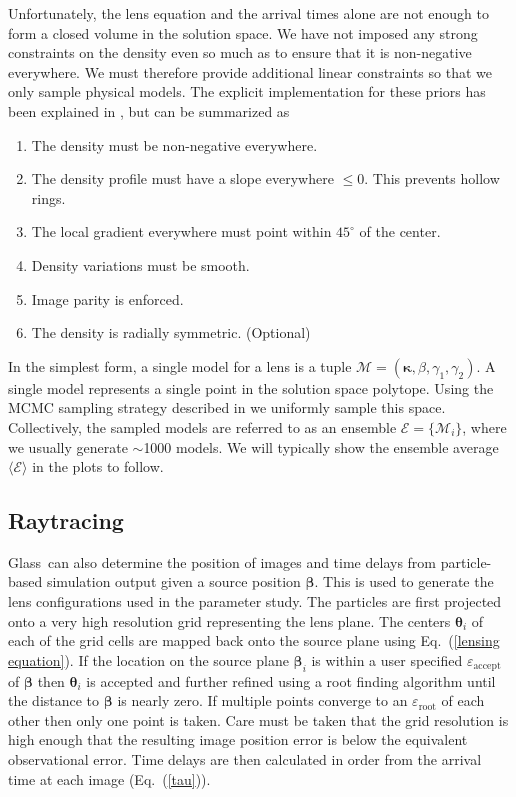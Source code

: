 \documentclass[galley]{mn2e}
\newcommand{\Glass}{{\sc Glass}}
\newcommand{\M}{\ensuremath{\mathscr{M}}}
\newcommand{\E}{\ensuremath{\mathscr{E}}}
\newcommand{\eps}{\ensuremath{\varepsilon}}
\newcommand{\Eavg}{\ensuremath{\langle \E \rangle}}
\newcommand{\eqnref}[1] {Eq.~(\ref{#1})}
\renewcommand{\vec}[1]{\ensuremath{\boldsymbol{#1}}}
\begin{document}
Unfortunately, the lens equation and the arrival times alone are not enough to form a
closed volume in the solution space. We have not imposed any strong constraints
on the density even so much as to ensure that it is non-negative everywhere. We
must therefore provide additional linear constraints so that we only sample
physical models. The explicit implementation for these priors has been
explained in \cite{}, but can be summarized as
\begin{enumerate}
\item The density must be non-negative everywhere.
\item The density profile must have a slope everywhere $\le 0$. This prevents hollow rings.
\item The local gradient everywhere must point within $45^{\circ}$ of the center.
\item Density variations must be smooth.
\item Image parity is enforced.
\item The density is radially symmetric. (Optional)
\end{enumerate}

In the simplest form, a single model for a lens is a tuple $\M = (\vec\kappa,
\beta, \gamma_1, \gamma_2)$. A single model represents a single point in the
solution space polytope. Using the MCMC sampling strategy described in \cite{}
we uniformly sample this space. Collectively, the sampled models are referred
to as an ensemble $\E = \{\M_i\}$, where we usually generate $\sim$1000 models. We
will typically show the ensemble average $\Eavg$ in the plots to
follow.



\subsection{Raytracing}
\label{Raytracing}
\Glass\ can also determine the position of images and time delays from 
particle-based simulation output given a source position $\vec\beta$. This is
used to generate the lens configurations used in the parameter study.  The
particles are first projected onto a very high resolution grid representing the
lens plane. The centers $\vec\theta_i$ of each of the grid cells are mapped
back onto the source plane using \eqnref{lensing equation}. If the location on
the source plane $\vec\beta_i$ is within a user specified
$\eps_\mathrm{accept}$ of $\vec\beta$ then $\vec\theta_i$ is 
accepted and further refined using a root finding algorithm until the distance
to $\vec\beta$ is nearly zero. If multiple points converge to an
$\eps_\mathrm{root}$ of each other then only one point is taken.  Care must be
taken that the grid resolution is high enough that the resulting image position
error is below the equivalent observational error. Time delays are then
calculated in order from the arrival time at each image (\eqnref{tau}).
\end{document}
